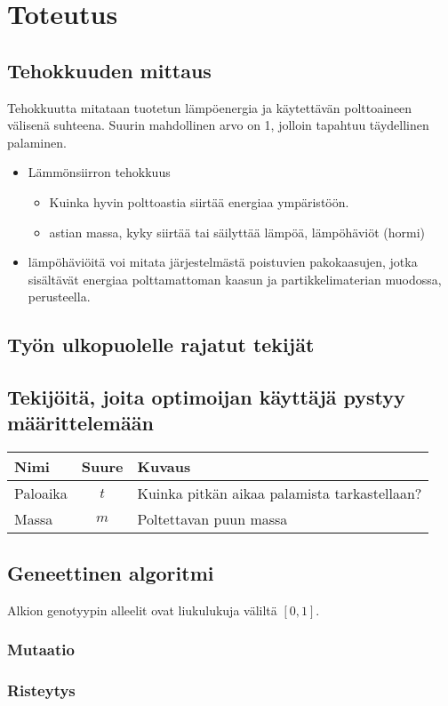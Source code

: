 \section{Toteutus}

\subsection{Tehokkuuden mittaus}
Tehokkuutta mitataan tuotetun lämpöenergia ja käytettävän polttoaineen välisenä
suhteena. Suurin mahdollinen arvo on 1, jolloin tapahtuu täydellinen palaminen.

\begin{itemize}
	\item Lämmönsiirron tehokkuus
		\begin{itemize}
			\item Kuinka hyvin polttoastia siirtää energiaa ympäristöön.
			\item astian massa, kyky siirtää tai säilyttää lämpöä, lämpöhäviöt (hormi)
		\end{itemize}
	\item lämpöhäviöitä voi mitata järjestelmästä poistuvien pakokaasujen, jotka
	sisältävät energiaa polttamattoman kaasun ja partikkelimaterian muodossa, perusteella.
\end{itemize}

\subsection{Työn ulkopuolelle rajatut tekijät}

\subsection{Tekijöitä, joita optimoijan käyttäjä pystyy määrittelemään}
\begin{tabular*}{\textwidth}{lcl}
	\toprule
	\bf Nimi & \bf Suure & \bf Kuvaus \\
	\midrule
	Paloaika & \(t\) & Kuinka pitkän aikaa palamista tarkastellaan? \\
	Massa & \(m\) & Poltettavan puun massa \\
	\bottomrule
\end{tabular*}

\subsection{Geneettinen algoritmi}
Alkion genotyypin alleelit ovat liukulukuja väliltä \([0, 1]\).

\subsubsection{Mutaatio}
\subsubsection{Risteytys}
